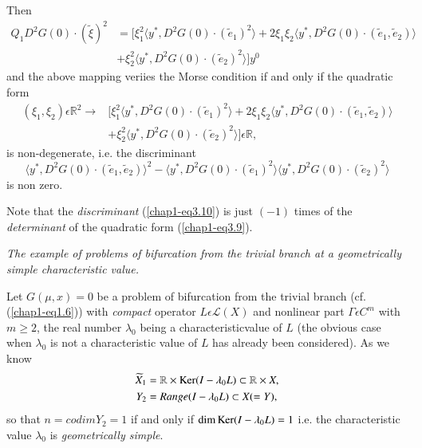 Then 
\begin{align*}
Q_{1}D^{2}G(0) \cdot (\widetilde{\xi})^{2} & = [\xi_{1}^{2} \langle y^{*}, D^{2}G(0) \cdot (\widetilde{e}_{1})^{2} \rangle + 2 \xi_{1} \xi_{2} \langle y^{*}, D^{2}G(0) \cdot (\widetilde{e}_{1}, \widetilde{e}_{2}) \rangle \\
& +\xi_{2}^{2} \langle y^{*}, D^{2}G(0) \cdot (\widetilde{e}_{2})^{2} \rangle ] y^{0}
\end{align*}
and the above mapping veriies the Morse condition if and only if the quadratic form
\begin{align*}
(\xi_{1}, \xi_{2}) \epsilon \mathbb{R}^{2} \to & [\xi_{1}^{2}  \langle y^{*}, D^{2}G(0) \cdot (\widetilde{e}_{1})^{2} \rangle + 2 \xi_{1} \xi_{2}  \langle y^{*}, D^{2}G(0) \cdot (\widetilde{e}_{1}, \widetilde{e}_{2}) \rangle \\
& + \xi_{2}^{2} \langle y^{*} , D^{2}G(0) \cdot (\widetilde{e}_{2})^{2}  \rangle ] \epsilon \mathbb{R},\tag{3.9}\label{chap1-eq3.9}
\end{align*}
is non-degenerate, i.e. the discriminant
\begin{equation*}
\langle y^{*}, D^{2}G(0) \cdot (\widetilde{e}_{1}, \widetilde{e}_{2}) \rangle^{2} - \langle y^{*}, D^{2}G(0) \cdot (\widetilde{e}_{1})^{2} \rangle \langle y^{*}, D^{2}G(0) \cdot (\widetilde{e}_{2})^{2}  \rangle \tag{3.10}\label{chap1-eq3.10}
\end{equation*}
is non zero.

\begin{remark}\label{chap1-rem3.5}
Note that the {\em discriminant} (\ref{chap1-eq3.10}) is just $(-1)$ times of the {\em determinant} of the quadratic form (\ref{chap1-eq3.9}).
\end{remark}

{\em The example of problems of bifurcation from the trivial branch at a geometrically simple characteristic value.}

Let $G(\mu, x) = 0$ be a problem of bifurcation from the trivial branch (cf. (\ref{chap1-eq1.6})) with {\em compact} operator $L \epsilon \mathscr{L}(X)$ and nonlinear part $\Gamma \epsilon C^{m}$ with $m \geq 2$, the real number $\lambda_{0}$ being a characteristic\pageoriginale  value of $L$ (the obvious case when $\lambda_{0}$ is not a characteristic value of $L$ has already been considered). As we know
\begin{align*}
\widetilde{X}_{1} & = \mathbb{R} \times \operatorname{Ker} (I - \lambda_{0}L) \subset \mathbb{R} \times X,\\
Y_{2} & = Range (I - \lambda_{0}L) \subset X(= Y),
\end{align*}
so that $n = codim Y_{2} = 1$ if and only if $\dim \operatorname{Ker} (I - \lambda_{0}L) = 1$ i.e. the characteristic value $\lambda_{0}$ is {\em geometrically simple}.

